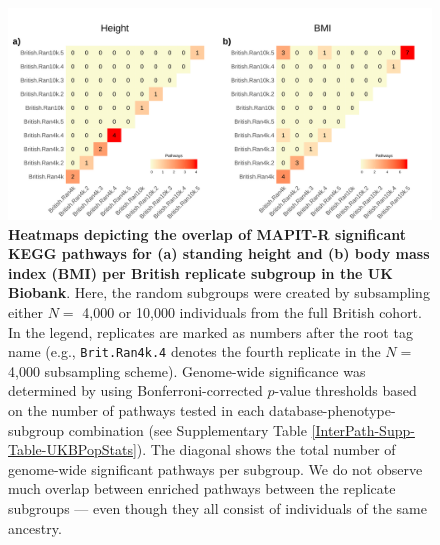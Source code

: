 \documentclass[10pt]{article}
\begin{document}
\begin{landscape}
\begin{figure}[htbp]
\centering
\includegraphics[scale=.2]{Images/Supp/InterPath_Supp_Figure_BritReps_Heatplots_KEGG_vs4.png}
\caption{\textbf{Heatmaps depicting the overlap of MAPIT-R significant KEGG pathways for (a) standing height and (b) body mass index (BMI) per British replicate subgroup in the UK Biobank}. Here, the random subgroups were created by subsampling either $N =$ 4,000 or 10,000 individuals from the full British cohort. In the legend, replicates are marked as numbers after the root tag name (e.g., \texttt{Brit.Ran4k.4} denotes the fourth replicate in the $N =$ 4,000 subsampling scheme). Genome-wide significance was determined by using Bonferroni-corrected $p$-value thresholds based on the number of pathways tested in each database-phenotype-subgroup combination (see Supplementary Table \ref{InterPath-Supp-Table-UKBPopStats}). The diagonal shows the total number of genome-wide significant pathways per subgroup. We do not observe much overlap between enriched pathways between the replicate subgroups --- even though they all consist of individuals of the same ancestry.}
\label{InterPath-Supp-Figure-BritReps-Heatplots-AllPaths-KEGG}
\end{figure}
\clearpage
\end{landscape}

\end{document}
